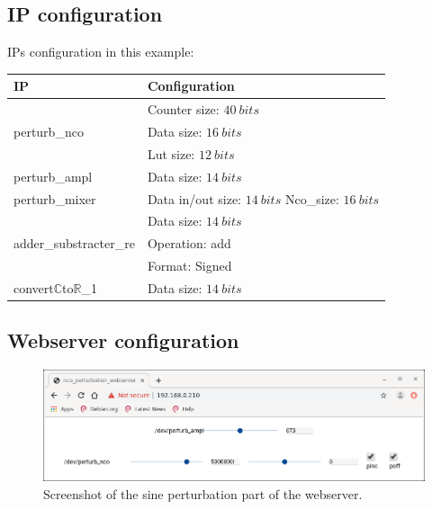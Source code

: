 \documentclass[12pt,oneside]{article}
\begin{document}
\subsection{IP configuration}
\vspace{0cm}
IPs configuration in this example:
\begin{center}
	\begin{tabular}{|>{\centering\arraybackslash}m{.3\linewidth} | >{\centering\arraybackslash}m{.3\linewidth} |}
		\hline
		IP & Configuration \\
		\hline
		& Counter size: $40~bits$\\ perturb\_nco &Data size: $16~bits$\\ &Lut size: $12~bits$ \\
		\hline
		perturb\_ampl&Data size: $14~bits$ \\
		\hline
		perturb\_mixer&Data in/out size: $14~bits$ \newline Nco\_size: $16~bits$ \\
		\hline
		& Data size: $14~bits$\\adder\_substracter\_re & Operation: add\\ &Format: Signed \\
		\hline
		convert$\mathbb{C}$to$\mathbb{R}$\_1&Data size: $14~bits$\\
		\hline
	\end{tabular}
\end{center}
\vspace{0cm}
\newpage
\subsection{Webserver configuration}


\begin{figure}[!h!tb]
	\begin{center}
		\includegraphics[width=14cm]{webserver/2020-01-13-104008_907x265_scrot.png}
		\caption{Screenshot of the sine perturbation part of the webserver.}
		\label{fig:amplModWs}
	\end{center}
\end{figure}
\vspace{-0.5cm}
\end{document}

